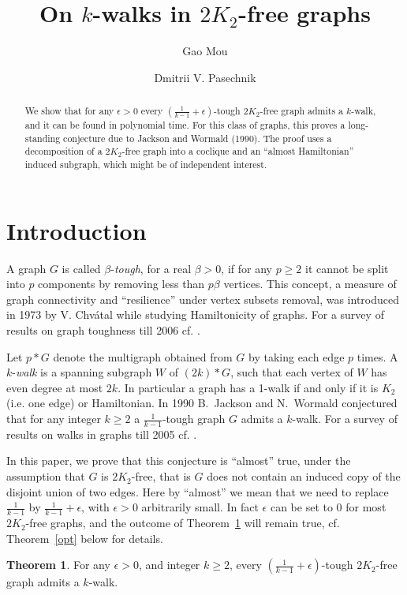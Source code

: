 \documentclass{amsart}
\theoremstyle{definition}
\newtheorem{theorem}{Theorem}
\begin{document}
\author{Gao Mou}
\address{School of Physical and Mathematical Sciences, Nanyang Technological University, Singapore} 
\author{Dmitrii V. Pasechnik}
\address{Department of Computer Science, The University of Oxford, UK}

\title{On $k$-walks in $2K_2$-free graphs}
\begin{abstract}
We show that for any $\epsilon>0$ every $(\frac{1}{k-1}+\epsilon)$-tough
$2K_2$-free graph admits a $k$-walk, and it can be found in polynomial time. 
For this class of graphs, this proves a
long-standing conjecture due to Jackson and Wormald (1990). The proof uses a
decomposition of a $2K_2$-free graph into a coclique and an ``almost Hamiltonian''
induced subgraph, which might be of independent interest.
\end{abstract}

\maketitle

\section{Introduction}
A graph $G$ is called $\beta$-{\em tough}, for a real $\beta>0$, if for any $p\geq 2$ it
cannot be split into $p$ components by removing less than $p\beta$ vertices.  
This concept, a measure of graph connectivity and ``resilience'' under vertex subsets removal,
was introduced in 1973 by V. Chv\'{a}tal 
while studying   Hamiltonicity of graphs. For a survey of results on graph toughness till 2006
cf. \cite{MR2221006}.

Let $p*G$ denote the multigraph obtained from $G$ by taking each edge $p$ times. 
A $k$-{\em walk} is a spanning subgraph $W$ of $(2k)*G$, such that each vertex of $W$ 
has even degree at most $2k$. %
In particular a graph has a 1-walk if and only if it is $K_2$ (i.e. one edge) or Hamiltonian.
In 1990 B.~Jackson and N.~Wormald conjectured \cite{jackson1990k} that for any integer $k\ge2$ a
$\frac{1}{k-1}$-tough graph $G$ admits a $k$-walk.
{For a survey of results on walks in graphs till 2005 cf. \cite{kouider2005connected}.}

In this paper, we prove that this conjecture is ``almost'' true, under the
assumption that $G$ is  $2K_2$-free, that is $G$ does not contain an induced
copy of the disjoint union of two edges.  Here by ``almost'' we
mean that we need to replace $\frac{1}{k-1}$ by
$\frac{1}{k-1}+\epsilon$, with $\epsilon>0$ arbitrarily small.  In fact
$\epsilon$ can be set to 0 for most $2K_2$-free graphs, and the outcome of
Theorem~\ref{thm2} will remain true, cf. Theorem~\ref{opt} below for details.
\begin{theorem}\label{thm2} 
For any $\epsilon>0$, and integer $k\ge2$, every
$\left(\frac{1}{k-1}+\epsilon\right)$-tough $2K_2$-free graph admits a $k$-walk.
\end{theorem}
\end{document}

